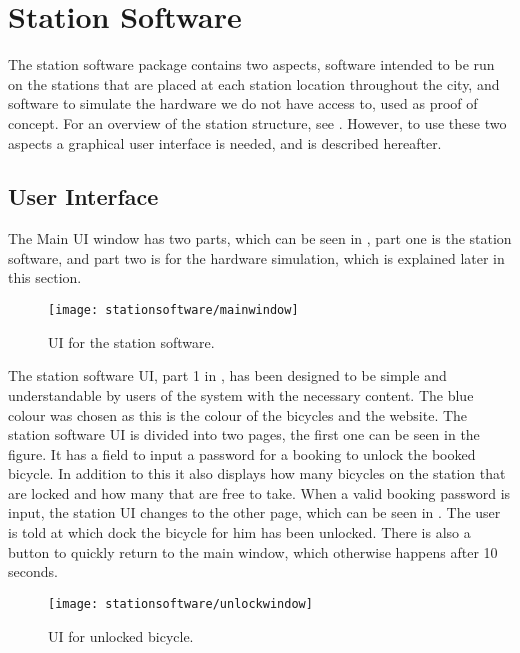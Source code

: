\section{Station Software}
The station software package contains two aspects, software intended to be run on the stations that are placed at each station location throughout the city, and software to simulate the hardware we do not have access to, used as proof of concept.
For an overview of the station structure, see . 
However, to use these two aspects a graphical user interface is needed, and is described hereafter.

\subsection{User Interface}
The Main UI window has two parts, which can be seen in , part one is the station software, and part two is for the hardware simulation, which is explained later in this section.

\begin{figure}[h]
	\centering
	\texttt{[image: stationsoftware/mainwindow]}
	\caption{UI for the station software.}\label{fig:stationMain}
\end{figure}

The station software UI, part 1 in , has been designed to be simple and understandable by users of the system with the necessary content.
The blue colour was chosen as this is the colour of the bicycles and the \bycykel website.
The station software UI is divided into two pages, the first one can be seen in the figure.
It has a field to input a password for a booking to unlock the booked bicycle.
In addition to this it also displays how many bicycles on the station that are locked and how many that are free to take.
When a valid booking password is input, the station UI changes to the other page, which can be seen in .
The user is told at which dock the bicycle for him has been unlocked.
There is also a button to quickly return to the main window, which otherwise happens after 10 seconds.

\begin{figure}[h]
	\centering
	\texttt{[image: stationsoftware/unlockwindow]}
	\caption{UI for unlocked bicycle.}\label{fig:bicycleUnlock}
\end{figure}

